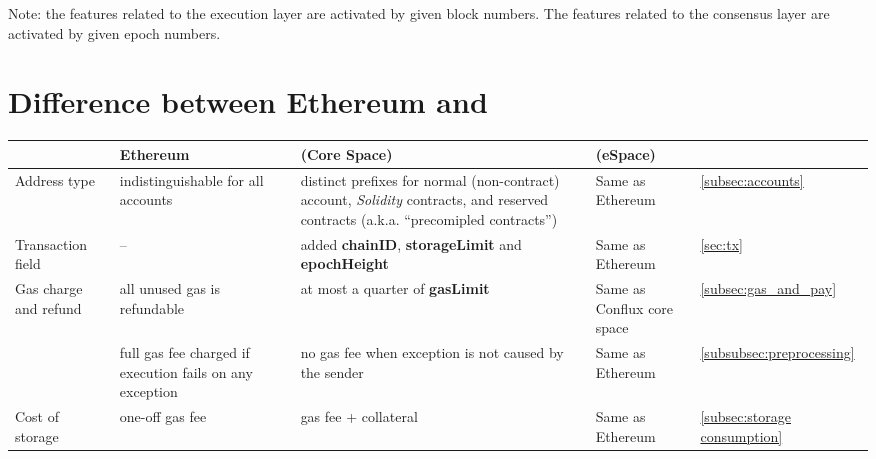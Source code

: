 Note: the features related to the execution layer are activated by given block numbers. The features related to the consensus layer are activated by given epoch numbers. 
\newpage

\section{Difference between Ethereum and {\name}}
\begin{center}
	\begin{tabu}{X X X X l}%
			\toprule
			 &  
			\textbf{Ethereum} & \textbf{{\name}} (Core Space) &  \textbf{{\name}} (eSpace) & \\
			\midrule
			Address	type & indistinguishable for all accounts  
			& distinct prefixes for normal (non-contract) account, \emph{Solidity} contracts, and reserved contracts (a.k.a. ``precomipled contracts'')  & Same as Ethereum & \cref{subsec:accounts} \\
			\hline
			Transaction field	& --	& added {\bf chainID}, {\bf storageLimit} and {\bf epochHeight} & Same as Ethereum 	& \cref{sec:tx} 
			\\
			\hline
			Gas charge and refund & all unused gas is refundable & at most a quarter of {\bf gasLimit} & Same as Conflux core space & \cref{subsec:gas_and_pay} \\
			& full gas fee charged if execution fails on any exception 
			& no gas fee when exception is not caused by the sender  & Same as Ethereum &  \cref{subsubsec:preprocessing} \\
			\hline
			Cost of storage & one-off gas fee &  gas fee + collateral & Same as Ethereum& \cref{subsec:storage consumption}  \\

\end{tabu}
\end{center}
